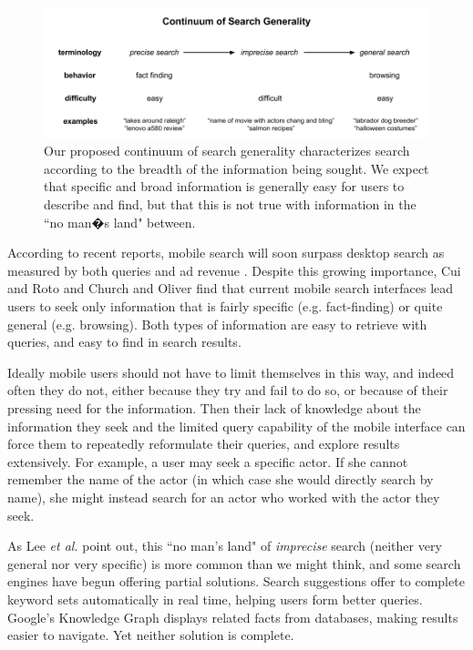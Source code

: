 \begin{figure}[ht]
\centering
\includegraphics[width=\textwidth]{images/terminologydiagram}
\caption{ Our proposed continuum of search generality characterizes search according to the breadth of the information being sought. We expect that specific and broad information is generally easy for users to describe and find, but that this is not true with information in the ``no man�s land" between.}
\label{fig:searchcontinuum}
\end{figure}




According to recent reports, mobile search will soon surpass desktop search as measured by both queries and ad revenue \cite{MobileQueries}\cite{MobileRevenue}. Despite this growing importance, Cui and Roto \cite{Cui:2008} and Church and Oliver \cite{Church:2011} find that current mobile search interfaces lead users to seek only information that is fairly specific (e.g. fact-finding) or quite general (e.g. browsing). Both types of information are easy to retrieve with queries, and easy to find in search results.

Ideally mobile users should not have to limit themselves in this way, and indeed often they do not, either because they try and fail to do so, or because of their pressing need for the information. Then their lack of knowledge about the information they seek and the limited query capability of the mobile interface \cite{Kamvar:2009} can force them to repeatedly reformulate their queries, and explore results extensively. For example, a user may seek a specific actor. If she cannot remember the name of the actor (in which case she would directly search by name), she might instead search for an actor who worked with the actor they seek.

As Lee \textit{et al.} \cite{Lee:2012} point out, this ``no man's land" of \textit{imprecise} search (neither very general nor very specific) is more common than we might think, and some search engines have begun offering partial solutions. Search suggestions offer to complete keyword sets automatically in real time, helping users form better queries. Google's Knowledge Graph \cite{GoogleKnowledgeGraph} displays related facts from databases, making results easier to navigate. Yet neither solution is complete.

